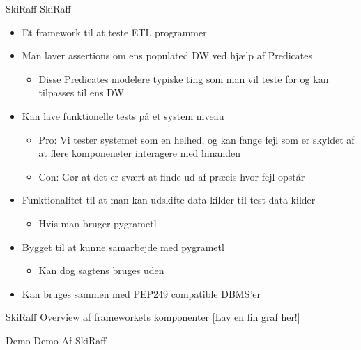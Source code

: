 \begin{frame}{SkiRaff}{}
  SkiRaff
  \begin{itemize}
  \item<2-> Et framework til at teste ETL programmer
  \item<3-> Man laver assertions om ens populated DW ved hjælp af Predicates
    \begin{itemize}
      \item Disse Predicates modelere typiske ting som man vil teste for og kan tilpasses til ens DW
    \end{itemize}
  \item<4-> Kan lave funktionelle tests på et system niveau
    \begin{itemize}
    \item Pro: Vi tester systemet som en helhed, og kan fange fejl som er skyldet af at flere komponeneter interagere med hinanden
    \item Con: Gør at det er svært at finde ud af præcis hvor fejl opstår
    \end{itemize}
  \item<5-> Funktionalitet til at man kan udskifte data kilder til test data kilder
    \begin{itemize}
    \item Hvis man bruger pygrametl
    \end{itemize}
  \item<6-> Bygget til at kunne samarbejde med pygrametl
    \begin{itemize}
    \item Kan dog sagtens bruges uden
    \end{itemize}
  \item<7-> Kan bruges sammen med PEP249 compatible DBMS'er
  \end{itemize}
\end{frame}

\begin{frame}{SkiRaff}{}
  Overview af frameworkets komponenter %
  [Lav en fin graf her!]
\end{frame}

\begin{frame}{Demo}{}
Demo Af SkiRaff
\end{frame}

